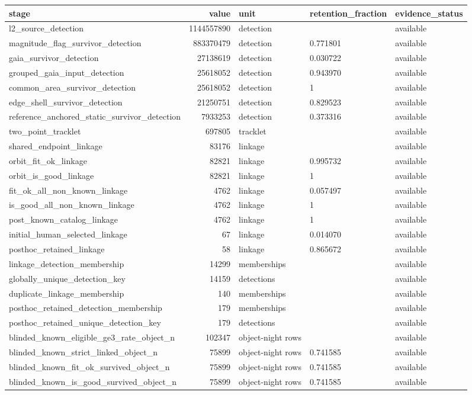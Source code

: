 \begin{tabular}{lrlll}
\toprule
stage & value & unit & retention\_fraction & evidence\_status \\
\midrule
l2\_source\_detection & 1144557890 & detection &  & available \\
magnitude\_flag\_survivor\_detection & 883370479 & detection & 0.771801 & available \\
gaia\_survivor\_detection & 27138619 & detection & 0.030722 & available \\
grouped\_gaia\_input\_detection & 25618052 & detection & 0.943970 & available \\
common\_area\_survivor\_detection & 25618052 & detection & 1 & available \\
edge\_shell\_survivor\_detection & 21250751 & detection & 0.829523 & available \\
reference\_anchored\_static\_survivor\_detection & 7933253 & detection & 0.373316 & available \\
two\_point\_tracklet & 697805 & tracklet &  & available \\
shared\_endpoint\_linkage & 83176 & linkage &  & available \\
orbit\_fit\_ok\_linkage & 82821 & linkage & 0.995732 & available \\
orbit\_is\_good\_linkage & 82821 & linkage & 1 & available \\
fit\_ok\_all\_non\_known\_linkage & 4762 & linkage & 0.057497 & available \\
is\_good\_all\_non\_known\_linkage & 4762 & linkage & 1 & available \\
post\_known\_catalog\_linkage & 4762 & linkage & 1 & available \\
initial\_human\_selected\_linkage & 67 & linkage & 0.014070 & available \\
posthoc\_retained\_linkage & 58 & linkage & 0.865672 & available \\
linkage\_detection\_membership & 14299 & memberships &  & available \\
globally\_unique\_detection\_key & 14159 & detections &  & available \\
duplicate\_linkage\_membership & 140 & memberships &  & available \\
posthoc\_retained\_detection\_membership & 179 & memberships &  & available \\
posthoc\_retained\_unique\_detection\_key & 179 & detections &  & available \\
blinded\_known\_eligible\_ge3\_rate\_object\_n & 102347 & object-night rows &  & available \\
blinded\_known\_strict\_linked\_object\_n & 75899 & object-night rows & 0.741585 & available \\
blinded\_known\_fit\_ok\_survived\_object\_n & 75899 & object-night rows & 0.741585 & available \\
blinded\_known\_is\_good\_survived\_object\_n & 75899 & object-night rows & 0.741585 & available \\
\bottomrule
\end{tabular}
